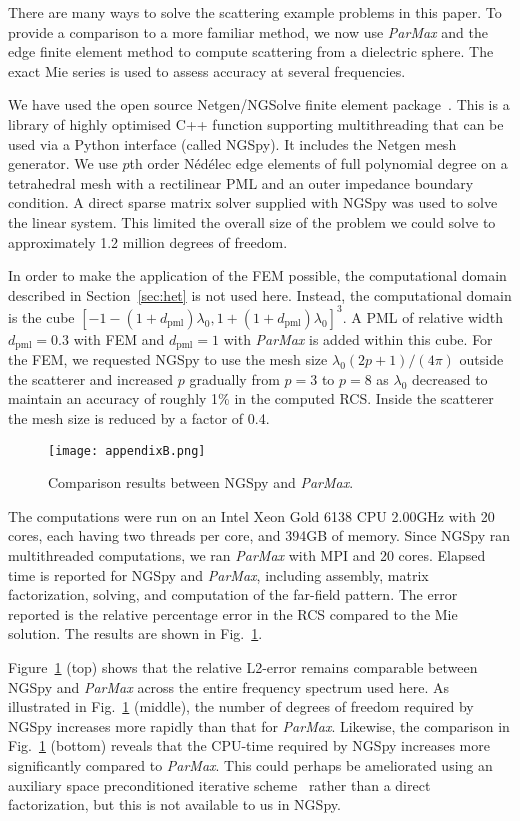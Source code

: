 \documentclass[a4paper,12pt]{article}
\begin{document}
There are many ways to solve the scattering example problems in this
paper. To provide a comparison to a more familiar method, we now use
\emph{ParMax} and the edge finite element method to compute scattering
from a dielectric sphere.  The exact Mie series is used to assess
accuracy at several frequencies. 

We have used the open source Netgen/NGSolve finite element
package~\cite{netgen}.  This is a library of highly optimised C++
function supporting multithreading that can be used via a Python
interface (called NGSpy).  It includes the Netgen mesh generator.  We
use $p$th order N\'ed\'elec edge elements of full polynomial degree on
a tetrahedral mesh with a rectilinear PML and an outer impedance
boundary condition.  A direct sparse matrix solver supplied with NGSpy
was used to solve the linear system.  This limited the overall size of
the problem we could solve to approximately 1.2 million degrees of
freedom.

In order to make the application of the FEM possible, the
computational domain described in Section~\ref{sec:het} is not used
here. Instead, the computational domain is the cube
$[-1-(1+d_{\mathrm{pml}})\lambda_0,1+(1+d_{\mathrm{pml}})\lambda_0]^3$. A
PML of relative width $d_{\mathrm{pml}}=0.3$ with FEM and
$d_{\mathrm{pml}}=1$ with \emph{ParMax} is added within this cube. For
the FEM, we requested NGSpy to use the mesh size
$\lambda_0(2p+1)/(4\pi)$ outside the scatterer and increased $p$
gradually from $p=3$ to $p=8$ as $\lambda_0$ decreased to maintain an
accuracy of roughly 1\% in the computed RCS. Inside the scatterer the
mesh size is reduced by a factor of 0.4.

\begin{figure}[!hbt]
    \centering
    \texttt{[image: appendixB.png]}
\caption{Comparison results between NGSpy and \emph{ParMax}.}
    \label{fig:comparison}
\end{figure}

The computations were run on an Intel Xeon Gold 6138 CPU \@ 2.00GHz
with 20 cores, each having two threads per core, and 394GB of
memory. Since NGSpy ran multithreaded computations, we ran
\emph{ParMax} with MPI and 20 cores. Elapsed time is reported for
NGSpy and \emph{ParMax}, including assembly, matrix factorization,
solving, and computation of the far-field pattern. The error reported
is the relative percentage error in the RCS compared to the Mie
solution. The results are shown in Fig.~\ref{fig:comparison}.

Figure~\ref{fig:comparison} (top) shows that the relative L2-error
remains comparable between NGSpy and \emph{ParMax} across the entire
frequency spectrum used here. As illustrated in
Fig.~\ref{fig:comparison} (middle), the number of degrees of freedom
required by NGSpy increases more rapidly than that for
\emph{ParMax}. Likewise, the comparison in Fig.~\ref{fig:comparison}
(bottom) reveals that the CPU-time required by NGSpy increases more
significantly compared to \emph{ParMax}. This could perhaps be
ameliorated using an auxiliary space preconditioned iterative
scheme~\cite{HiptmairXu} rather than a direct factorization, but this
is not available to us in NGSpy.
\end{document}
